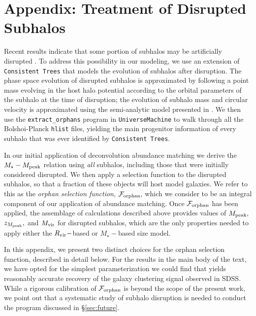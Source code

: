 \documentclass[usenatbib,usegraphicx,letterpaper]{mn2e}
\newcommand{\mstar}{M_{\star}}
\newcommand{\mvir}{M_{\rm vir}}
\newcommand{\mpeak}{M_{\rm peak}}
\newcommand{\zpeak}{z_{M_{\rm peak}}}
\newcommand{\rvir}{R_{\rm vir}}
\begin{document}


\newpage
\section*{Appendix: Treatment of Disrupted Subhalos}



Recent results indicate that some portion of subhalos may be artificially disrupted \citep{guo_white13, campbell_etal17, vdBosch_etal17, vdbosch_ogiya18}. To address this possibility in our modeling, we use an extension of {\tt Consistent Trees} that models the evolution of subhalos after disruption. The phase space evolution of disrupted subhalos is approximated by following a point mass evolving in the host halo potential according to the orbital parameters of the subhalo at the time of disruption; the evolution of subhalo mass and circular velocity is approximated using the semi-analytic model presented in \citet{jiang_vdB14}. We then use the {\tt extract\_orphans} program in {\tt UniverseMachine} to walk through all the Bolshoi-Planck {\tt hlist} files, yielding the main progenitor information of every subhalo that was ever identified by {\tt Consistent Trees}.

In our initial application of deconvolution abundance matching we derive the $\mstar-\mpeak$ relation using {\em all} subhalos, including those that were initially considered disrupted. We then apply a selection function to the disrupted subhalos, so that a fraction of these objects will host model galaxies. We refer to this as the {\em orphan selection function}, $\mathcal{F}_{\rm orphan},$ which we consider to be an integral component of our application of abundance matching. Once $\mathcal{F}_{\rm orphan}$ has been applied, the assemblage of calculations described above provides values of $\mpeak,$ $\zpeak,$ and $\mvir$ for disrupted subhalos, which are the only properties needed to apply either the $\rvir-$based or $\mstar-$based size model.

In this appendix, we present two distinct choices for the orphan selection function, described in detail below. For the results in the main body of the text, we have opted for the simplest parameterization we could find that yields reasonably accurate recovery of the galaxy clustering signal observed in SDSS. While a rigorous calibration of $\mathcal{F}_{\rm orphan}$ is beyond the scope of the present work, we point out that a systematic study of subhalo disruption is needed to conduct the program discussed in \S\ref{sec:future}.
\end{document}
